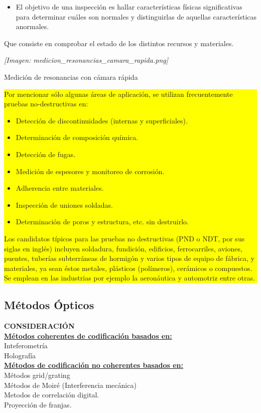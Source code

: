 \documentclass[12pt]{article}
\begin{document}
	\begin{itemize}
		\item El objetivo de una inspección es hallar características físicas significativas para determinar cuáles son normales y distinguirlas de aquellas características anormales.
	\end{itemize}
	
	Que consiste en comprobar el estado de los distintos recursos y materiales.
	
	\begin{minipage}{0.4\textwidth}
		\textit{[Imagen: medicion\_resonancias\_camara\_rapida.png]}
	\end{minipage}
	\hfill
	\begin{minipage}{0.5\textwidth}
		\LARGE{Medición de resonancias con cámara rápida}
	\end{minipage}
	
	\vspace{0.5cm}
	\colorbox{yellow}{\parbox{\textwidth}{
			Por mencionar sólo algunas áreas de aplicación, se utilizan frecuentemente pruebas no-destructivas en:
			\begin{itemize}
				\item Detección de discontinuidades (internas y superficiales).
				\item Determinación de composición química.
				\item Detección de fugas.
				\item Medición de espesores y monitoreo de corrosión.
				\item Adherencia entre materiales.
				\item Inspección de uniones soldadas.
				\item Determinación de poros y estructura, etc. sin destruirlo.
			\end{itemize}
			
			Los candidatos típicos para las pruebas no destructivas (PND o NDT, por sus siglas en inglés) incluyen soldadura, fundición, edificios, ferrocarriles, aviones, puentes, tuberías subterráneas de hormigón y varios tipos de equipo de fábrica, y materiales, ya sean éstos metales, plásticos (polímeros), cerámicos o compuestos. \\
			Se emplean en las industrias por ejemplo la aeronáutica y automotriz entre otras.
	}}
	
	\subsection{Métodos Ópticos}
	\textbf{CONSIDERACIÓN} \\
	\underline{\textbf{Métodos coherentes de codificación basados en:}} \\
	Inteferometría \\
	Holografía \\
	\underline{\textbf{Métodos de codificación no coherentes basados en:}} \\
	Métodos grid/grating \\
	Métodos de Moiré (Interferencia mecánica) \\
	Metodos de correlación digital. \\
	Proyección de franjas.
	
\end{document}
